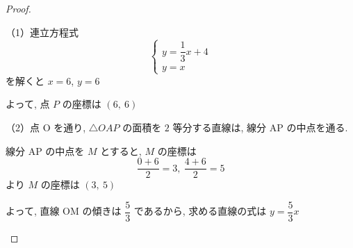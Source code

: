 \begin{proof}\mbox{}\\
    \begin{hiddenanswer}
        （1）連立方程式
        \[
        \begin{cases}
            y = \dfrac{1}{3}x + 4 \\
            y = x
        \end{cases}
        \]
        を解くと $x = 6$, $y = 6$

        よって, 点 $P$ の座標は $(6,\ 6)$

        （2）点 O を通り, $\triangle OAP$ の面積を $2$ 等分する直線は, 線分 AP の中点を通る.

        線分 AP の中点を $M$ とすると, $M$ の座標は
        \[\dfrac{0 + 6}{2} = 3,\ \dfrac{4 + 6}{2} = 5\]
        より $M$ の座標は $(3,\ 5)$

        よって, 直線 OM の傾きは $\dfrac{5}{3}$ であるから, 求める直線の式は $y = \dfrac{5}{3}x$
    \end{hiddenanswer}
\end{proof}

\newpage

